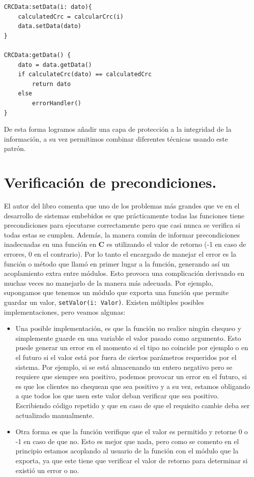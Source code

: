 \begin{lstlisting}[caption=Implementación métodos setData y getData]
CRCData:setData(i: dato){
    calculatedCrc = calcularCrc(i)
    data.setData(dato)
}

CRCData:getData() {
    dato = data.getData()
    if calculateCrc(dato) == calculatedCrc
        return dato
    else
        errorHandler()
}
\end{lstlisting}

De esta forma logramos añadir una capa de protección a la integridad de la información, a su vez permitimos combinar diferentes técnicas usando este patrón.

\section{Verificación de precondiciones.}
El autor del libro comenta que uno de los problemas más grandes que ve en el desarrollo de sistemas embebidos es que prácticamente todas las funciones tiene precondiciones para ejecutarse correctamente pero que casi nunca se verifica si todas estas se cumplen. Además, la manera común de informar precondiciones inadecuadas en una función en \textbf{C} es utilizando el valor de retorno (-1 en caso de errores, 0 en el contrario). Por lo tanto el encargado de manejar el error es la función o método que llamó en primer lugar a la función, generando así un acoplamiento extra entre módulos. Esto provoca una complicación derivando en muchas veces no manejarlo de la manera más adecuada. Por ejemplo, supongamos que tenemos un módulo que exporta una función que permite guardar un valor, \verb|setValor(i: Valor)|. Existen múltiples posibles implementaciones, pero veamos algunas:
\begin{itemize}
    \item Una posible implementación, es que la función no realice ningún chequeo y simplemente guarde en una variable el valor pasado como argumento. Esto puede generar un error en el momento si el tipo no coincide por ejemplo o en el futuro si el valor está por fuera de ciertos parámetros requeridos por el sistema. Por ejemplo, si se está almacenando un entero negativo pero se requiere que siempre sea positivo, podemos provocar un error en el futuro, si es que los clientes no chequean que sea positivo y a su vez, estamos obligando a que todos los que usen este valor deban verificar que sea positivo. Escribiendo código repetido y que en caso de que el requisito cambie deba ser actualizado manualmente.
    \item Otra forma es que la función verifique que el valor es permitido y retorne 0 o -1 en caso de que no. Esto es mejor que nada, pero como se comento en el principio estamos acoplando al usuario de la función con el módulo que la exporta, ya que este tiene que verificar el valor de retorno para determinar si existió un error o no.
\end{itemize}

